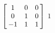 {$\left[\hskip -3pt \begin{array}{ccc} 1&0&0\\  0&1&0
\\  -1&1&1\end{array}\hskip -3pt \right] $} 
{$1$}

  

 


